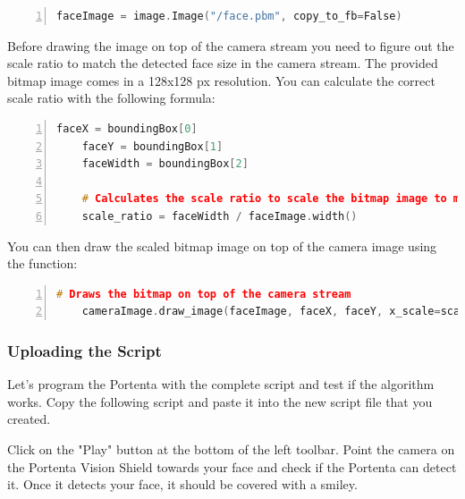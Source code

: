 \begin{lstlisting}[language=C++, frame=single, numbers=left, basicstyle=\ttfamily\small]
	faceImage = image.Image("/face.pbm", copy_to_fb=False)
\end{lstlisting}

Before drawing the image on top of the camera stream you need to figure out the scale ratio to match the detected face size in the camera stream. The provided bitmap image comes in a 128x128 px resolution. You can calculate the correct scale ratio with the following formula:

\begin{lstlisting}[language=C++, frame=single, numbers=left, basicstyle=\ttfamily\small]
	faceX = boundingBox[0]
	faceY = boundingBox[1]
	faceWidth = boundingBox[2]
	
	# Calculates the scale ratio to scale the bitmap image to match the bounding box
	scale_ratio = faceWidth / faceImage.width()
\end{lstlisting}

You can then draw the scaled bitmap image on top of the camera image using the  function:

\begin{lstlisting}[language=C++, frame=single, numbers=left, basicstyle=\ttfamily\small]
	# Draws the bitmap on top of the camera stream
	cameraImage.draw_image(faceImage, faceX, faceY, x_scale=scale_ratio, y_scale=scale_ratio)
\end{lstlisting}

\subsubsection{Uploading the Script} Let's program the Portenta with the complete script and test if the algorithm works. Copy the following script and paste it into the new script file that you created. \cite{portentaFaceFilter:2024}

{
	\label{BitmapImage}
}

Click on the "Play" button at the bottom of the left toolbar. Point the camera on the Portenta Vision Shield towards your face and check if the Portenta can detect it. Once it detects your face, it should be covered with a smiley.

